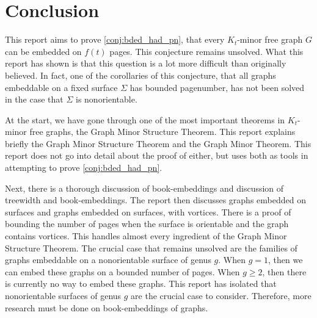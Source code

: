 \chapter{Conclusion}\label{chap:conclusion}

This report aims to prove \cref{conj:bded_had_pn}, that every $K_t$-minor free graph $G$ can be embedded on $f(t)$ pages. This conjecture remains unsolved. What this report has shown is that this question is a lot more difficult than originally believed. In fact, one of the corollaries of this conjecture, that all graphs embeddable on a fixed surface $\Sigma$ has bounded pagenumber, has not been solved in the case that $\Sigma$ is nonorientable. 

At the start, we have gone through one of the most important theorems in $K_t$-minor free graphs, the Graph Minor Structure Theorem. This report explains briefly the Graph Minor Structure Theorem and the Graph Minor Theorem. This report does not go into detail about the proof of either, but uses both as tools in attempting to prove \cref{conj:bded_had_pn}. 

Next, there is a thorough discussion of book-embeddings and discussion of treewidth and book-embeddings. The report then discusses graphs embedded on surfaces and graphs embedded on surfaces, with vortices. There is a proof of bounding the number of pages when the surface is orientable and the graph contains vortices. This handles almost every ingredient of the Graph Minor Structure Theorem. The crucial case that remains unsolved are the families of graphs embeddable on a nonorientable surface of genus $g$. When $g = 1$, then we can embed these graphs on a bounded number of pages. When $g \geq 2$, then there is currently no way to embed these graphs. This report has isolated that nonorientable surfaces of genus $g$ are the crucial case to consider. Therefore, more research must be done on book-embeddings of graphs. 